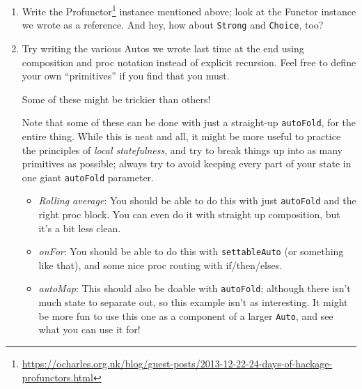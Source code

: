 \documentclass[]{article}
\renewcommand{\href}[2]{#2\footnote{\url{#1}}}
\begin{document}
\begin{enumerate}
\def\labelenumi{\arabic{enumi}.}
\item
  Write the
  \href{https://ocharles.org.uk/blog/guest-posts/2013-12-22-24-days-of-hackage-profunctors.html}{Profunctor}
  instance mentioned above; look at the Functor instance we wrote as a
  reference. And hey, how about \texttt{Strong} and \texttt{Choice},
  too?
\item
  Try writing the various Autos we wrote last time at the end using
  composition and proc notation instead of explicit recursion. Feel free
  to define your own ``primitives'' if you find that you must.

  Some of these might be trickier than others!

  Note that some of these can be done with just a straight-up
  \texttt{autoFold}, for the entire thing. While this is neat and all,
  it might be more useful to practice the principles of \emph{local
  statefulness}, and try to break things up into as many primitives as
  possible; always try to avoid keeping every part of your state in one
  giant \texttt{autoFold} parameter.

  \begin{itemize}
  \item
    \emph{Rolling average}: You should be able to do this with just
    \texttt{autoFold} and the right proc block. You can even do it with
    straight up composition, but it's a bit less clean.
  \item
    \emph{onFor}: You should be able to do this with
    \texttt{settableAuto} (or something like that), and some nice proc
    routing with if/then/elses.
  \item
    \emph{autoMap}: This should also be doable with \texttt{autoFold};
    although there isn't much state to separate out, so this example
    isn't as interesting. It might be more fun to use this one as a
    component of a larger \texttt{Auto}, and see what you can use it
    for!
  \end{itemize}
\end{enumerate}
\end{document}
